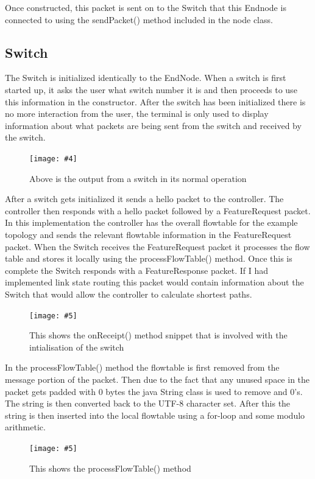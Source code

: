 \documentclass{article}
\newcommand{\includescalefigure}[5]{
\begin{figure}[htb]
\centering
\texttt{[image: \#5]}
\captionsetup{width=.8\linewidth} 
\caption[#2]{#3}
\label{#1}
\end{figure}
}
\newcommand{\includefigure}[4]{
\begin{figure}[htb]
\centering
\texttt{[image: \#4]}
\captionsetup{width=.8\linewidth} 
\caption[#2]{#3}
\label{#1}
\end{figure}
}
\begin{document}
Once constructed, this packet is sent on to the Switch that this Endnode is connected to using the sendPacket() method included in the node class.

\subsection{Switch}
The Switch is initialized identically to the EndNode. When a switch is first started up, it asks the user what switch number it is and then proceeds to use this information in the constructor. 
\newline
After the switch has been initialized there is no more interaction from the user, the terminal is only used to display information about what packets are being sent from the switch and received by the switch.

\includefigure{SwitchDisplay}{Switch in normal operation}{Above is the output from a switch in its normal operation}{Switch-Display.PNG}

After a switch gets initialized it sends a hello packet to the controller. The controller then responds with a hello packet followed by a FeatureRequest packet. In this implementation the controller has the overall flowtable for the example topology and sends the relevant flowtable information in the FeatureRequest packet. When the Switch receives the FeatureRequest packet it processes the flow table and stores it locally using the processFlowTable() method. Once this is complete the Switch responds with a FeatureResponse packet. If I had implemented link state routing this packet would contain information about the Switch that would allow the controller to calculate shortest paths.

 \includescalefigure{SwitchIntialisation}{Switch onReceipt()}{This shows the onReceipt() method snippet that is involved with the intialisation of the switch}{0.7}{Switch-Intialisation.PNG}
 
 In the processFlowTable() method the flowtable is first removed from the message portion of the packet. Then due to the fact that any unused space in the packet gets padded with 0 bytes the java String class is used to remove and 0's. The string is then converted back to the UTF-8 character set. After this the string is then inserted into the local flowtable using a for-loop and some modulo arithmetic.
 
\includescalefigure{ProcessFlowtable}{ProcessFlowtable Method}{This shows the processFlowTable() method}{0.7}{ProcessFlowTable-Method.PNG}
\pagebreak
\end{document}
